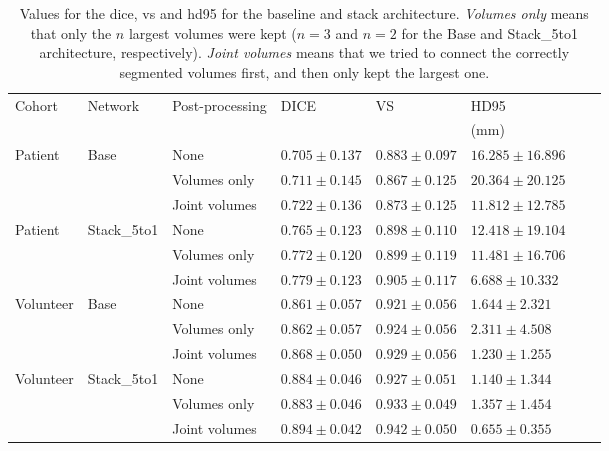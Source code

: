 \begin{table}[htbp]
   \centering
   \caption[Segmentation Evaluation Metrics for the different Architectures]{Values for the \acrlong{dice}, \acrlong{vs} and \acrlong{hd95} for the baseline and stack architecture. \textit{Volumes only} means that only the $n$ largest volumes were kept ($n = 3$ and $n = 2$ for the Base and Stack\_5to1 architecture, respectively). \textit{Joint volumes} means that we tried to connect the correctly segmented volumes first, and then only kept the largest one.}
   \begin{tabular}{l*{7}{l}}
      \toprule
      Cohort	& Network	& Post-processing	& DICE				& VS				& HD95\\
      			&					&					&					&					& (mm)\\
      \midrule
      Patient   & Base 	& None & $0.705 \pm 0.137$ & $\mathbf{0.883 \pm 0.097}$ & $16.285 \pm 16.896$\\
                &                	& Volumes only  & $0.711 \pm 0.145$ & $0.867 \pm 0.125$ & $20.364 \pm 20.125$\\
                &                	& Joint volumes & $\mathbf{0.722 \pm 0.136}$ & $0.873 \pm 0.125$ & $\mathbf{11.812 \pm 12.785}$\\
      \midrule
      Patient   & Stack\_5to1 	& None & $0.765 \pm 0.123$ & $0.898 \pm 0.110$ & $12.418 \pm 19.104$\\
                &                	& Volumes only  & $0.772 \pm 0.120$ & $0.899 \pm 0.119$ & $11.481 \pm 16.706$\\
                &                	& Joint volumes      & $\mathbf{0.779 \pm 0.123}$ & $\mathbf{0.905 \pm 0.117}$ & $\mathbf{6.688  \pm 10.332}$\\
      \midrule
      Volunteer & Base 	& None & $0.861 \pm 0.057$ & $0.921 \pm 0.056$ & $1.644  \pm 2.321 $\\
                &                	& Volumes only  & $0.862 \pm 0.057$ & $0.924 \pm 0.056$ & $2.311  \pm 4.508 $\\
                &                	& Joint volumes      & $\mathbf{0.868 \pm 0.050}$ & $\mathbf{0.929 \pm 0.056}$ & $\mathbf{1.230  \pm 1.255}$\\
      \midrule
      Volunteer & Stack\_5to1 	& None & $0.884 \pm 0.046$ & $0.927 \pm 0.051$ & $1.140  \pm 1.344 $\\
                &                	& Volumes only  & $0.883 \pm 0.046$ & $0.933 \pm 0.049$ & $1.357  \pm 1.454 $\\
                &                	& Joint volumes      & $\mathbf{0.894 \pm 0.042}$ & $\mathbf{0.942 \pm 0.050}$ & $\mathbf{0.655  \pm 0.355}$\\
      \bottomrule
   \end{tabular}
   \label{tab:results_pp_small}
\end{table}

